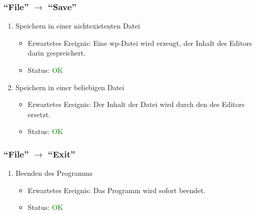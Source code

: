 \subsubsection{"`File"' $\rightarrow$ "`Save"'}
\begin{enumerate}
\item Speichern in einer nichtexistenten Datei
\begin{itemize}
\item Erwartetes Ereignis: Eine wp-Datei wird erzeugt, der Inhalt des Editors darin gespreichert. 
\item Status: \textcolor{green}{OK} 
\end{itemize}
\item Speichern in einer beliebigen Datei
\begin{itemize}
\item Erwartetes Ereignis: Der Inhalt der Datei wird durch den des Editors ersetzt. 
\item Status: \textcolor{green}{OK} 
\end{itemize}
\end{enumerate}
\subsubsection{"`File"' $\rightarrow$ "`Exit"'}
\begin{enumerate}
\item Beenden des Programms
\begin{itemize}
\item Erwartetes Ereignis: Das Programm wird sofort beendet. 
\item Status: \textcolor{green}{OK}
\end{itemize}
\end{enumerate}
